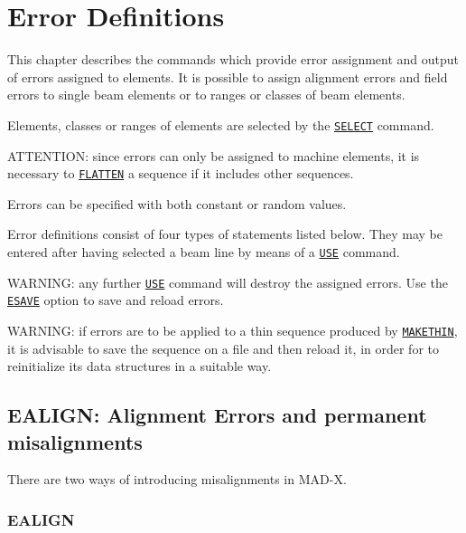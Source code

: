 
\chapter{Error Definitions}
\label{chap:error}
This chapter describes the commands which provide error assignment and
output of errors assigned to elements. It is possible to assign
alignment errors and field errors to single beam elements or to ranges
or classes of beam elements.

Elements, classes or ranges of elements are selected by the
\hyperref[sec:select]{\texttt{SELECT}} command.

ATTENTION: since errors can only be assigned to machine elements, it is
necessary to \hyperref[sec:flatten]{\texttt{FLATTEN}} a sequence
if it includes other sequences.

Errors can be specified with both constant or random values.

Error definitions consist of four types of statements listed below. They
may be entered after having selected a beam line by means of a
\hyperref[sec:use]{\texttt{USE}} command.  

WARNING: any further \hyperref[sec:use]{\texttt{USE}} command
will destroy the assigned errors. Use the
\hyperref[sec:esave]{\texttt{ESAVE}} option to save and reload errors.

WARNING: if errors are to be applied to a thin sequence produced by \hyperref[chap:makethin]{\texttt{MAKETHIN}}, it is advisable to save the sequence on a file and then reload it, in order for \madx to reinitialize its data structures in a suitable way.



%

\section{EALIGN: Alignment Errors and permanent misalignments} %
\label{sec:ealign}

There are two ways of introducing misalignments in MAD-X.
\subsection{EALIGN}

